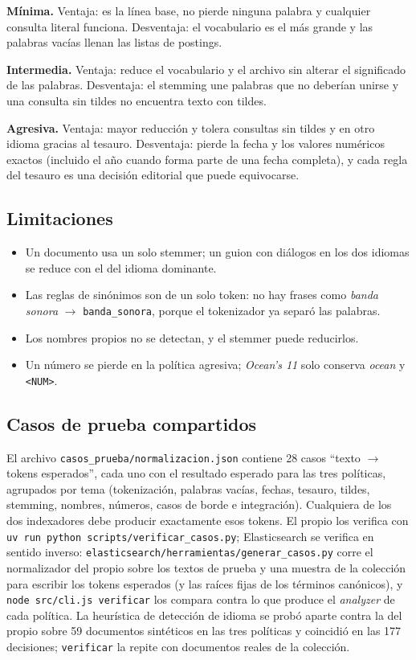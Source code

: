 \documentclass[11pt,spanish]{article}
\begin{document}
\textbf{Mínima.} Ventaja: es la línea base, no pierde ninguna palabra y cualquier consulta literal funciona. Desventaja: el vocabulario es el más grande y las palabras vacías llenan las listas de postings.

\textbf{Intermedia.} Ventaja: reduce el vocabulario y el archivo sin alterar el significado de las palabras. Desventaja: el stemming une palabras que no deberían unirse y una consulta sin tildes no encuentra texto con tildes.

\textbf{Agresiva.} Ventaja: mayor reducción y tolera consultas sin tildes y en otro idioma gracias al tesauro. Desventaja: pierde la fecha y los valores numéricos exactos (incluido el año cuando forma parte de una fecha completa), y cada regla del tesauro es una decisión editorial que puede equivocarse.

\subsection{Limitaciones}
\begin{itemize}
  \item Un documento usa un solo stemmer; un guion con diálogos en los dos idiomas se reduce con el del idioma dominante.
  \item Las reglas de sinónimos son de un solo token: no hay frases como \textit{banda sonora} $\to$ \texttt{banda\_sonora}, porque el tokenizador ya separó las palabras.
  \item Los nombres propios no se detectan, y el stemmer puede reducirlos.
  \item Un número se pierde en la política agresiva; \textit{Ocean's 11} solo conserva \textit{ocean} y \texttt{<NUM>}.
\end{itemize}

\subsection{Casos de prueba compartidos}
El archivo \texttt{casos\_prueba/normalizacion.json} contiene 28 casos ``texto $\to$ tokens esperados'', cada uno con el resultado esperado para las tres políticas, agrupados por tema (tokenización, palabras vacías, fechas, tesauro, tildes, stemming, nombres, números, casos de borde e integración). Cualquiera de los dos indexadores debe producir exactamente esos tokens. El propio los verifica con \texttt{uv run python scripts/verificar\_casos.py}; Elasticsearch se verifica en sentido inverso: \texttt{elasticsearch/herramientas/generar\_casos.py} corre el normalizador del propio sobre los textos de prueba y una muestra de la colección para escribir los tokens esperados (y las raíces fijas de los términos canónicos), y \texttt{node src/cli.js verificar} los compara contra lo que produce el \emph{analyzer} de cada política. La heurística de detección de idioma se probó aparte contra la del propio sobre 59 documentos sintéticos en las tres políticas y coincidió en las 177 decisiones; \texttt{verificar} la repite con documentos reales de la colección.
\end{document}
